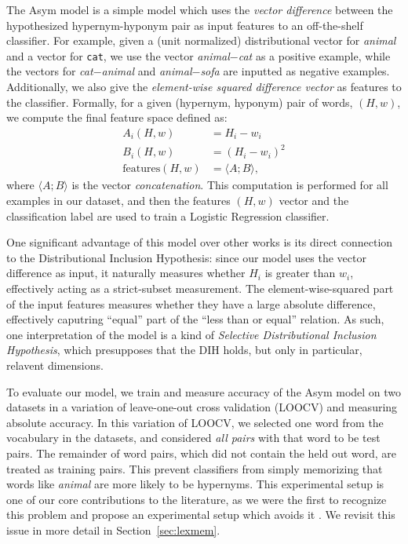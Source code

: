 \documentclass[12pt]{article}
\begin{document}
The Asym model is a simple model which uses the {\em vector difference} between
the hypothesized hypernym-hyponym pair as input features to an off-the-shelf
classifier. For example, given a (unit normalized) distributional vector for
{\em animal} and a vector for {\tt cat}, we use the vector
{\em animal}$ - ${\em cat} as a positive example, while the
vectors for {\em cat}$ - ${\em animal} and {\em animal}$ - ${\em sofa} are
inputted as negative examples. Additionally, we also give the {\em element-wise
squared difference vector} as features to the classifier. Formally, for a given
(hypernym, hyponym) pair of words, $(H, w)$, we compute the final feature space
defined as:
\begin{align*}
  A_i(H, w) & = H_i - w_i\\
  B_i(H, w) & = (H_i - w_i)^2\\
  \text{features}(H, w) & = \langle A; B\rangle,
\end{align*}
where $\langle A; B\rangle$ is the vector {\em concatenation}. This computation
is performed for all examples in our dataset, and then the features $(H, w)$
vector and the classification label are used to train a Logistic Regression
classifier.

One significant advantage of this model over other works is its direct
connection to the Distributional Inclusion Hypothesis: since our model uses the
vector difference as input, it naturally measures whether $H_i$ is
greater than $w_i$, effectively acting as a strict-subset measurement. The
element-wise-squared part of the input features measures whether they have a
large absolute difference, effectively caputring ``equal'' part of the
``less than or equal'' relation. As such, one interpretation of the model is a
kind of {\em Selective Distributional Inclusion Hypothesis}, which presupposes
that the DIH holds, but only in particular, relavent dimensions.

To evaluate our model, we train and measure accuracy of the Asym model on
two datasets in a variation of leave-one-out cross validation (LOOCV) and
measuring absolute accuracy. In this variation of LOOCV, we selected one word
from the vocabulary in the datasets, and considered {\em all pairs} with that
word to be test pairs. The remainder of word pairs, which did not contain the
held out word, are treated as training pairs. This prevent classifiers from
simply memorizing that words like {\em animal} are more likely to be hypernyms.
This experimental setup is one of our core contributions to the literature, as
we were the first to recognize this problem and propose an experimental
setup which avoids it \cite{roller:2014:coling}. We revisit this issue in
more detail in Section~\ref{sec:lexmem}.
\end{document}
